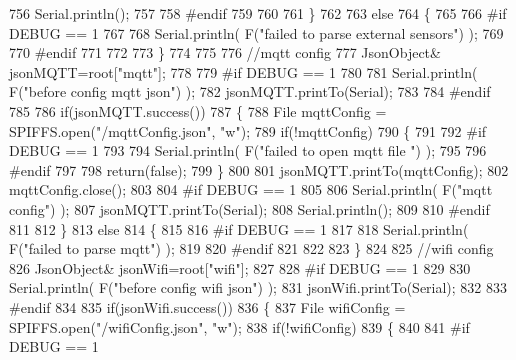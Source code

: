 \begin{DoxyCode}
756         Serial.println();
757 
758 \textcolor{preprocessor}{#endif }
759 
760 
761     \}
762 
763     \textcolor{keywordflow}{else}
764     \{   
765 
766 \textcolor{preprocessor}{    #if DEBUG == 1}
767         
768         Serial.println( F(\textcolor{stringliteral}{"failed to parse external sensors"}) );
769 
770 \textcolor{preprocessor}{    #endif}
771 
772 
773     \}
774 
775     
776     \textcolor{comment}{//mqtt config}
777         JsonObject& jsonMQTT=root[\textcolor{stringliteral}{"mqtt"}];
778     
779 \textcolor{preprocessor}{#if DEBUG == 1 }
780 
781     Serial.println( F(\textcolor{stringliteral}{"before config mqtt json"}) );
782     jsonMQTT.printTo(Serial);
783 
784 \textcolor{preprocessor}{#endif}
785 
786     \textcolor{keywordflow}{if}(jsonMQTT.success())
787     \{
788         File mqttConfig = SPIFFS.open(\textcolor{stringliteral}{"/mqttConfig.json"}, \textcolor{stringliteral}{"w"}); 
789         \textcolor{keywordflow}{if}(!mqttConfig)
790         \{
791         
792 \textcolor{preprocessor}{        #if DEBUG == 1 }
793 
794             Serial.println( F(\textcolor{stringliteral}{"failed to open mqtt file "}) );
795         
796 \textcolor{preprocessor}{        #endif}
797         
798             \textcolor{keywordflow}{return}(\textcolor{keyword}{false});
799         \}
800             
801         jsonMQTT.printTo(mqttConfig);
802         mqttConfig.close();
803 
804 \textcolor{preprocessor}{#if DEBUG == 1 }
805 
806         Serial.println( F(\textcolor{stringliteral}{"mqtt config"}) );
807         jsonMQTT.printTo(Serial);
808         Serial.println();
809 
810 \textcolor{preprocessor}{#endif}
811 
812     \}
813     \textcolor{keywordflow}{else}
814     \{
815 
816 \textcolor{preprocessor}{    #if DEBUG == 1 }
817 
818         Serial.println( F(\textcolor{stringliteral}{"failed to parse mqtt"}) );
819     
820 \textcolor{preprocessor}{    #endif}
821 
822     
823     \}   
824 
825     \textcolor{comment}{//wifi config}
826         JsonObject& jsonWifi=root[\textcolor{stringliteral}{"wifi"}];
827     
828 \textcolor{preprocessor}{#if DEBUG == 1 }
829 
830     Serial.println( F(\textcolor{stringliteral}{"before config wifi json"}) );
831     jsonWifi.printTo(Serial);
832 
833 \textcolor{preprocessor}{#endif}
834 
835     \textcolor{keywordflow}{if}(jsonWifi.success())
836     \{
837         File wifiConfig = SPIFFS.open(\textcolor{stringliteral}{"/wifiConfig.json"}, \textcolor{stringliteral}{"w"}); 
838         \textcolor{keywordflow}{if}(!wifiConfig)
839         \{
840         
841 \textcolor{preprocessor}{        #if DEBUG == 1 }

\end{DoxyCode}
